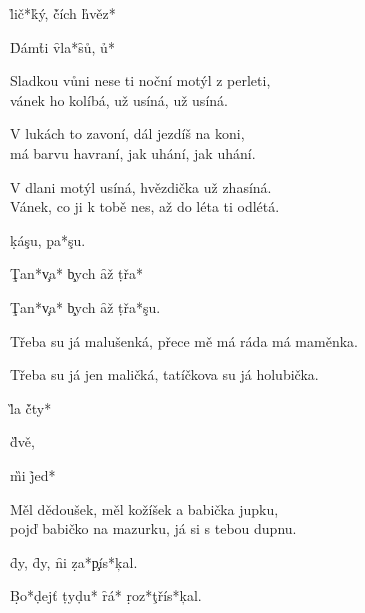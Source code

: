


\p {} \h{lič*}\h{ký,}\p
{}\p {}\h{čích} \h{hvěz*}\p

\h{Dám}\p \h{ti}   \f{vla*}\f{sů,}
   \h{u*}

Sladkou vůni nese ti noční motýl z perleti,\\
vánek ho kolíbá, už usíná, už usíná.

V lukách to zavoní, dál jezdíš na koni,\\
má barvu havraní, jak uhání, jak uhání.

V dlani motýl usíná, hvězdička už zhasíná.\\
Vánek, co ji k tobě nes, až do léta ti odlétá.



\d{ká}\p \c{su,}\p
{} \d{pa*}\pp\c{su.}\p

\c{Tan*}\c{va*} \c{bych}\p {}\p
\f{až}  \d{třa*}\pp{}\p

\c{Tan*}\c{va*} \c{bych}\p {}\p
\f{až}  \d{třa*}\pp\c{su.}\p

Třeba su já malušenká, přece mě má ráda má maměnka.

Třeba su já jen maličká, tatíčkova su já holubička.



\G{la} \pp{}\p
\h{čty*} \pp{}\p

 \pp{}\p {}\p\G{dvě,}\p

 \G{mi} \pp{}\p
\h{jed*} \pp{}\p

\p {}\p {}\pp{}\p

Měl dědoušek, měl kožíšek a babička jupku,\\
pojď babičko na mazurku, já si s tebou dupnu.



 \p{}\f{dy,}
 \p{}\f{dy,}
\f{ni} \d{za*}\c{pís*}\pp\c{kal.}

\d{Bo*}\pp\d{dejť}  \d{ty}\p \d{du*}
\f{rá*} \d{roz*}\c{třís*}\pp\c{kal.}



